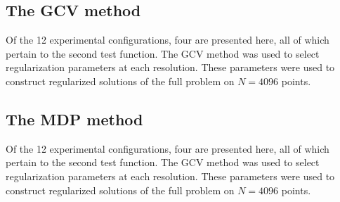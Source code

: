 \documentclass[12pt]{article}
\begin{document}
\subsection{The GCV method} 
Of the 12 experimental configurations, four are presented here, all of which pertain to the second test function. The GCV method was used to select regularization parameters at each resolution. These parameters were used to construct regularized solutions of the full problem on $N = 4096$ points.

\subsection{The MDP method}
Of the 12 experimental configurations, four are presented here, all of which pertain to the second test function. The GCV method was used to select regularization parameters at each resolution. These parameters were used to construct regularized solutions of the full problem on $N = 4096$ points.




\end{document}
